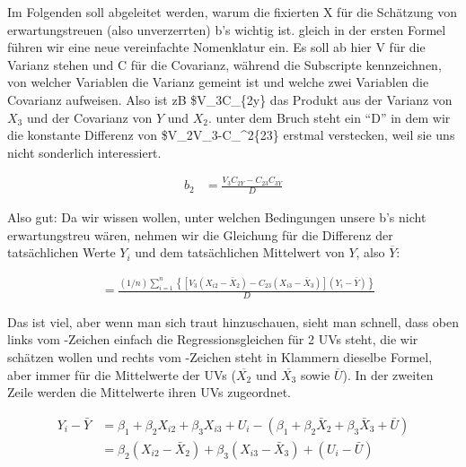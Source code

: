 \documentclass[
  10pt,
  letterpaper,
  a4paper, twoside]{scrreprt}
\begin{document}
\begin{tcolorbox}[enhanced jigsaw, coltitle=black, opacitybacktitle=0.6, toptitle=1mm, colbacktitle=quarto-callout-warning-color!10!white, colback=white, toprule=.15mm, opacityback=0, bottomrule=.15mm, arc=.35mm, colframe=quarto-callout-warning-color-frame, leftrule=.75mm, titlerule=0mm, breakable, left=2mm, rightrule=.15mm, title={IYI: Fixe X in Formeln abgeleitet}, bottomtitle=1mm]

Im Folgenden soll abgeleitet werden, warum die fixierten X für die
Schätzung von erwartungstreuen (also unverzerrten) b's wichtig ist.
gleich in der ersten Formel führen wir eine neue vereinfachte
Nomenklatur ein. Es soll ab hier V für die Varianz stehen und C für die
Covarianz, während die Subscripte kennzeichnen, von welcher Variablen
die Varianz gemeint ist und welche zwei Variablen die Covarianz
aufweisen. Also ist zB \$V\_3C\_\{2y\} das Produkt aus der Varianz von
\(X_3\) und der Covarianz von \(Y\) und \(X_2\). unter dem Bruch steht
ein \enquote{D} in dem wir die konstante Differenz von
\$V\_2V\_3-C\_\^{}2\{23\} erstmal verstecken, weil sie uns nicht
sonderlich interessiert.

\begin{align}
b_2 & =\frac{V_3 C_{2 Y}-C_{23} C_{3 Y}}{D} 
\end{align}

Also gut: Da wir wissen wollen, unter welchen Bedingungen unsere b's
nicht erwartungstreu wären, nehmen wir die Gleichung für die Differenz
der tatsächlichen Werte \(Y_i\) und dem tatsächlichen Mittelwert von
\(Y\), also \(\overline{Y}\):

\begin{align}
& =\frac{(1 / n) \sum_{i=1}^n\left\{\left[V_3\left(X_{i 2}-\bar{X}_2\right)-C_{23}\left(X_{i 3}-\bar{X}_3\right)\right]\left(Y_i-\bar{Y}\right)\right\}}{D}
\end{align}

Das ist viel, aber wenn man sich traut hinzuschauen, sieht man schnell,
dass oben links vom -Zeichen einfach die Regressionsgleichen für 2 UVs
steht, die wir schätzen wollen und rechts vom -Zeichen steht in Klammern
dieselbe Formel, aber immer für die Mittelwerte der UVs
(\(\overline{X_2}\) und \(\overline{X_3}\) sowie \(\overline{U}\)). In
der zweiten Zeile werden die Mittelwerte ihren UVs zugeordnet.

\begin{align}
Y_i-\bar{Y} & =\beta_1+\beta_2 X_{i 2}+\beta_3 X_{i 3}+U_i-\left(\beta_1+\beta_2 \bar{X}_2+\beta_3 \bar{X}_3+\bar{U}\right) \\
& =\beta_2\left(X_{i 2}-\bar{X}_2\right)+\beta_3\left(X_{i 3}-\bar{X}_3\right)+\left(U_i-\bar{U}\right)
\end{align}


\end{tcolorbox}
\end{document}
